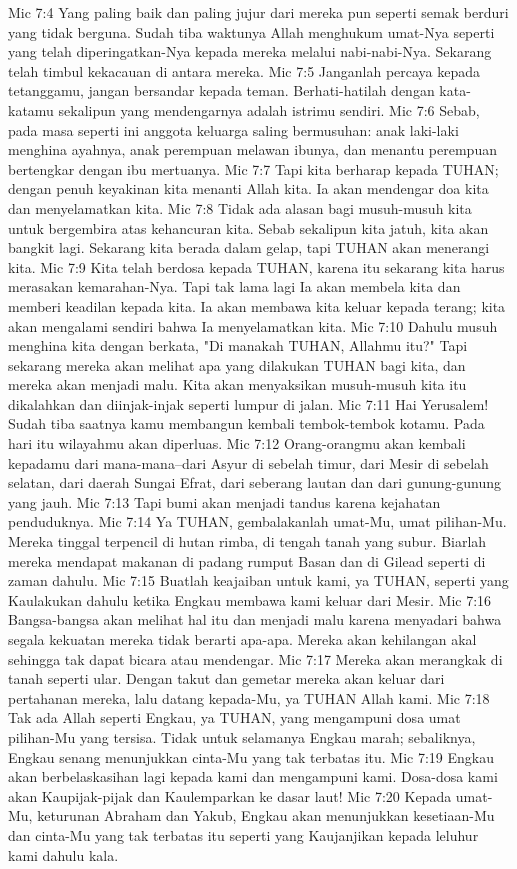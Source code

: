 Mic 7:4  Yang paling baik dan paling jujur dari mereka pun seperti semak berduri yang tidak berguna. Sudah tiba waktunya Allah menghukum umat-Nya seperti yang telah diperingatkan-Nya kepada mereka melalui nabi-nabi-Nya. Sekarang telah timbul kekacauan di antara mereka.
Mic 7:5  Janganlah percaya kepada tetanggamu, jangan bersandar kepada teman. Berhati-hatilah dengan kata-katamu sekalipun yang mendengarnya adalah istrimu sendiri.
Mic 7:6  Sebab, pada masa seperti ini anggota keluarga saling bermusuhan: anak laki-laki menghina ayahnya, anak perempuan melawan ibunya, dan menantu perempuan bertengkar dengan ibu mertuanya.
Mic 7:7  Tapi kita berharap kepada TUHAN; dengan penuh keyakinan kita menanti Allah kita. Ia akan mendengar doa kita dan menyelamatkan kita.
Mic 7:8  Tidak ada alasan bagi musuh-musuh kita untuk bergembira atas kehancuran kita. Sebab sekalipun kita jatuh, kita akan bangkit lagi. Sekarang kita berada dalam gelap, tapi TUHAN akan menerangi kita.
Mic 7:9  Kita telah berdosa kepada TUHAN, karena itu sekarang kita harus merasakan kemarahan-Nya. Tapi tak lama lagi Ia akan membela kita dan memberi keadilan kepada kita. Ia akan membawa kita keluar kepada terang; kita akan mengalami sendiri bahwa Ia menyelamatkan kita.
Mic 7:10  Dahulu musuh menghina kita dengan berkata, "Di manakah TUHAN, Allahmu itu?" Tapi sekarang mereka akan melihat apa yang dilakukan TUHAN bagi kita, dan mereka akan menjadi malu. Kita akan menyaksikan musuh-musuh kita itu dikalahkan dan diinjak-injak seperti lumpur di jalan.
Mic 7:11  Hai Yerusalem! Sudah tiba saatnya kamu membangun kembali tembok-tembok kotamu. Pada hari itu wilayahmu akan diperluas.
Mic 7:12  Orang-orangmu akan kembali kepadamu dari mana-mana--dari Asyur di sebelah timur, dari Mesir di sebelah selatan, dari daerah Sungai Efrat, dari seberang lautan dan dari gunung-gunung yang jauh.
Mic 7:13  Tapi bumi akan menjadi tandus karena kejahatan penduduknya.
Mic 7:14  Ya TUHAN, gembalakanlah umat-Mu, umat pilihan-Mu. Mereka tinggal terpencil di hutan rimba, di tengah tanah yang subur. Biarlah mereka mendapat makanan di padang rumput Basan dan di Gilead seperti di zaman dahulu.
Mic 7:15  Buatlah keajaiban untuk kami, ya TUHAN, seperti yang Kaulakukan dahulu ketika Engkau membawa kami keluar dari Mesir.
Mic 7:16  Bangsa-bangsa akan melihat hal itu dan menjadi malu karena menyadari bahwa segala kekuatan mereka tidak berarti apa-apa. Mereka akan kehilangan akal sehingga tak dapat bicara atau mendengar.
Mic 7:17  Mereka akan merangkak di tanah seperti ular. Dengan takut dan gemetar mereka akan keluar dari pertahanan mereka, lalu datang kepada-Mu, ya TUHAN Allah kami.
Mic 7:18  Tak ada Allah seperti Engkau, ya TUHAN, yang mengampuni dosa umat pilihan-Mu yang tersisa. Tidak untuk selamanya Engkau marah; sebaliknya, Engkau senang menunjukkan cinta-Mu yang tak terbatas itu.
Mic 7:19  Engkau akan berbelaskasihan lagi kepada kami dan mengampuni kami. Dosa-dosa kami akan Kaupijak-pijak dan Kaulemparkan ke dasar laut!
Mic 7:20  Kepada umat-Mu, keturunan Abraham dan Yakub, Engkau akan menunjukkan kesetiaan-Mu dan cinta-Mu yang tak terbatas itu seperti yang Kaujanjikan kepada leluhur kami dahulu kala.


